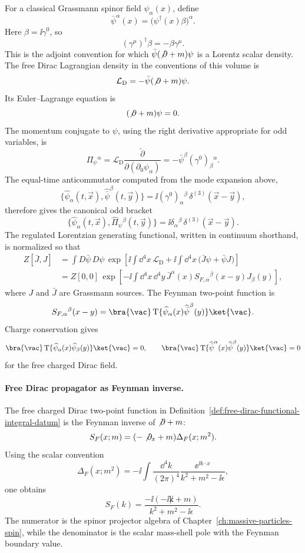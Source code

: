 \begin{definition}
\label{def:free-dirac-functional-integral-datum}
For a classical Grassmann spinor field \(\psi_\alpha(x)\), define
\[
  \bar\psi^\alpha(x)
  =
  \bigl(\psi^\dagger(x)\beta\bigr)^\alpha .
\]
Here \(\beta=\ii\gamma^0\), so
\[
  (\gamma^\mu)^\dagger\beta=-\beta\gamma^\mu .
\]
This is the adjoint convention for which \(\bar\psi(\not\partial+m)\psi\)
is a Lorentz scalar density.
The free Dirac Lagrangian density in the conventions of this volume is
\[
  \mathcal L_{\mathrm D}
  =
  -\bar\psi(\not\partial+m)\psi .
\]
Its Euler--Lagrange equation is
\[
  (\not\partial+m)\psi=0.
\]
The momentum conjugate to \(\psi\), using the right derivative appropriate
for odd variables, is
\[
  \Pi_\psi{}^\alpha
  =
  \mathcal L_{\mathrm D}
  \frac{\overleftarrow\partial}{\partial(\partial_0\psi_\alpha)}
  =
  -\bar\psi^\beta(\gamma^0)_\beta{}^\alpha .
\]
The equal-time anticommutator computed from the mode expansion above,
\[
  \{\widehat\psi_\alpha(t,\vec x),
    \widehat{\bar\psi}^{\beta}(t,\vec y)\}
  =
  \ii(\gamma^0)_\alpha{}^\beta\,\delta^{(3)}(\vec x-\vec y),
\]
therefore gives the canonical odd bracket
\[
  \{\widehat\psi_\alpha(t,\vec x),
    \widehat\Pi_\psi{}^\beta(t,\vec y)\}
  =
  \ii\delta_\alpha{}^\beta\,\delta^{(3)}(\vec x-\vec y).
\]
The regulated Lorentzian generating functional, written in continuum
shorthand, is normalized so that
\[
\begin{aligned}
  Z[\bar J,J]
  &=
  \int D\bar\psi\,D\psi\,
  \exp\left[
    \ii\int\dd^4x\,\mathcal L_{\mathrm D}
    +
    \ii\int\dd^4x\,
    \bigl(\bar J\psi+\bar\psi J\bigr)
  \right]  \\
  &=
  Z[0,0]\,
  \exp\left[
    -\ii\int\dd^4x\,\dd^4y\,
    \bar J^\alpha(x)
    S_{F,\alpha}{}^\beta(x-y)
    J_\beta(y)
  \right],
\end{aligned}
\]
where \(J\) and \(\bar J\) are Grassmann sources. The Feynman two-point
function is
\[
  S_{F,\alpha}{}^\beta(x-y)
  =
  \bra{\vac}
  \operatorname T\{
    \widehat\psi_\alpha(x)\widehat{\bar\psi}^{\beta}(y)
  \}
  \ket{\vac} .
\]
Charge conservation gives
\[
  \bra{\vac}\operatorname T\{
    \widehat\psi_\alpha(x)\widehat\psi_\beta(y)\}\ket{\vac}=0,
  \qquad
  \bra{\vac}\operatorname T\{
    \widehat{\bar\psi}^{\alpha}(x)
    \widehat{\bar\psi}^{\beta}(y)\}\ket{\vac}=0
\]
for the free charged Dirac field.
\end{definition}

\paragraph{Free Dirac propagator as Feynman inverse.}
The free charged Dirac two-point function in
Definition~\ref{def:free-dirac-functional-integral-datum} is the Feynman
inverse of \(\not\partial+m\):
\[
  S_F(x;m)
  =
  (-\not\partial_x+m)\Delta_F(x;m^2).
\]
Using the scalar convention
\[
  \Delta_F(x;m^2)
  =
  -\ii
  \int\frac{\dd^4k}{(2\pi)^4}
  \frac{\ee^{\ii k\cdot x}}{k^2+m^2-\ii\epsilon},
\]
one obtains
\[
  S_F(k)
  =
  \frac{-\ii(-\ii\not k+m)}
       {k^2+m^2-\ii\epsilon}.
\]
The numerator is the spinor projector algebra of
Chapter~\ref{ch:massive-particles-spin}, while the denominator is the scalar
mass-shell pole with the Feynman boundary value.

